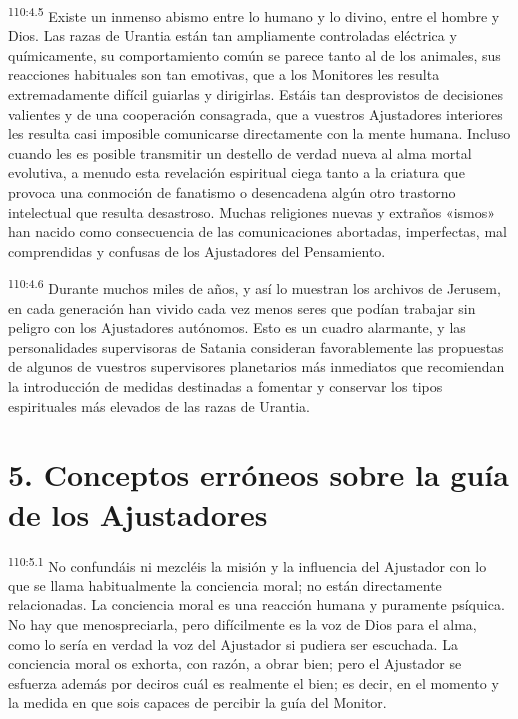 \par
\textsuperscript{110:4.5} Existe un inmenso abismo entre lo humano y lo divino, entre el hombre y Dios. Las razas de Urantia están tan ampliamente controladas eléctrica y químicamente, su comportamiento común se parece tanto al de los animales, sus reacciones habituales son tan emotivas, que a los Monitores les resulta extremadamente difícil guiarlas y dirigirlas. Estáis tan desprovistos de decisiones valientes y de una cooperación consagrada, que a vuestros Ajustadores interiores les resulta casi imposible comunicarse directamente con la mente humana. Incluso cuando les es posible transmitir un destello de verdad nueva al alma mortal evolutiva, a menudo esta revelación espiritual ciega tanto a la criatura que provoca una conmoción de fanatismo o desencadena algún otro trastorno intelectual que resulta desastroso. Muchas religiones nuevas y extraños «ismos» han nacido como consecuencia de las comunicaciones abortadas, imperfectas, mal comprendidas y confusas de los Ajustadores del Pensamiento.

\par
\textsuperscript{110:4.6} Durante muchos miles de años, y así lo muestran los archivos de Jerusem, en cada generación han vivido cada vez menos seres que podían trabajar sin peligro con los Ajustadores autónomos. Esto es un cuadro alarmante, y las personalidades supervisoras de Satania consideran favorablemente las propuestas de algunos de vuestros supervisores planetarios más inmediatos que recomiendan la introducción de medidas destinadas a fomentar y conservar los tipos espirituales más elevados de las razas de Urantia.

\section*{5. Conceptos erróneos sobre la guía de los Ajustadores}
\par
\textsuperscript{110:5.1} No confundáis ni mezcléis la misión y la influencia del Ajustador con lo que se llama habitualmente la conciencia moral; no están directamente relacionadas. La conciencia moral es una reacción humana y puramente psíquica. No hay que menospreciarla, pero difícilmente es la voz de Dios para el alma, como lo sería en verdad la voz del Ajustador si pudiera ser escuchada. La conciencia moral os exhorta, con razón, a obrar bien; pero el Ajustador se esfuerza además por deciros cuál es realmente el bien; es decir, en el momento y la medida en que sois capaces de percibir la guía del Monitor.

